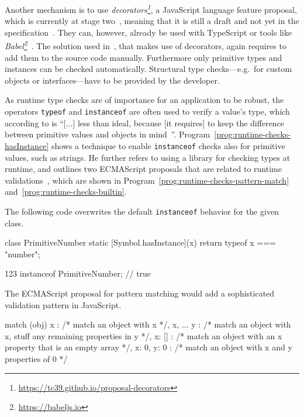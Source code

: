 Another mechanism is to use \textit{decorators\footnote{\url{https://tc39.github.io/proposal-decorators}}},
a JavaScript language feature proposal, which is currently at stage two~\cite{DecoratorsProposalRepo}, meaning that it is still a draft and not yet in the specification~\cite{EcmaScriptProposalProcess}. They can, however, already be used with TypeScript or tools like \emph{Babel\footnote{\url{https://babeljs.io}}}~\cite{TypeScriptHandbook:Decorators, Babel:Plugins:Decorators}.
The solution used in~\cite{DecoratorTypeChecks}, that makes use of decorators, again requires
to add them to the source code manually. Furthermore only primitive types and instances can be checked automatically. Structural type checks---e.g.\ for custom objects or interfaces---have
to be provided by the developer.

As runtime type checks are of importance for an application to be robust, the operators \texttt{typeof} and \texttt{instanceof} are often used to verify a value's type, which according to \citeauthor{DynamicTypeChecks:Rauschmayer:2017} is ``[...] less than ideal, because [it requires] to keep the difference between primitive values and objects in mind~\cite{DynamicTypeChecks:Rauschmayer:2017}''. Program~\ref{prog:runtime-checks-hasInstance} shows a technique to enable \texttt{instanceof} checks also for primitive values, such as strings. He further refers to using a library for checking types at runtime, and outlines two ECMAScript proposals that are related to runtime validations~\cite{DynamicTypeChecks:Rauschmayer:2017}, which are shown in Program~\ref{prog:runtime-checks-pattern-match} and~\ref{prog:runtime-checks-builtin}.

\begin{program}
\caption{The following code overwrites the default \texttt{instanceof} behavior for the given class.~\cites{DynamicTypeChecks:Rauschmayer:2017, DynamicTypeChecks:hasInstance}}
\label{prog:runtime-checks-hasInstance}
\begin{JsCode}
class PrimitiveNumber {
  static [Symbol.hasInstance](x) {
    return typeof x === "number";
  }
}

123 instanceof PrimitiveNumber; // true
\end{JsCode}
\end{program}

\begin{program}
\caption{The ECMAScript proposal for pattern matching would add a sophisticated validation pattern in JavaScript.~\cites{DynamicTypeChecks:Rauschmayer:2017, PatternMatchingProposalRepo}}
\label{prog:runtime-checks-pattern-match}
\begin{JsCode}
match (obj) {
  { x }: /* match an object with x */,
  { x, ... y }: /* match an object with x, stuff any remaining properties in y */,
  { x: [] }: /* match an object with an x property that is an empty array */,
  { x: 0, y: 0 }: /* match an object with x and y properties of 0 */
}
\end{JsCode}
\end{program}


